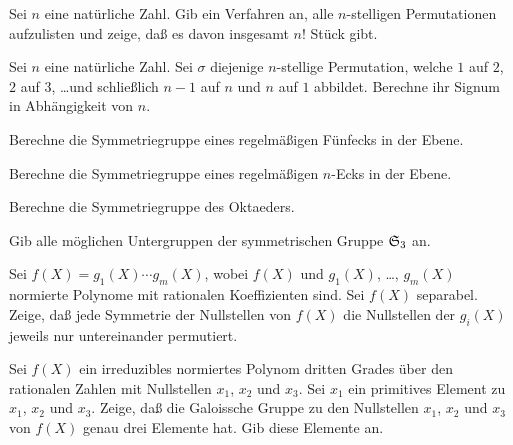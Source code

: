 \documentclass{algsheet}
\author{Dipl.-Math.~Arturo Mancino}
\date{12.~Januar 2011}
\begin{document}
                \maketitle



\begin{exercise}
    Sei \(n\) eine natürliche Zahl. Gib ein Verfahren an, alle \(n\)-stelligen Permutationen
    aufzulisten und zeige, daß es davon insgesamt \(n!\) Stück gibt. 
\end{exercise}

\begin{exercise}
    Sei \(n\) eine natürliche Zahl. Sei \(\sigma\) diejenige \(n\)-stellige Permutation, welche
    \(1\) auf \(2\), \(2\) auf \(3\), \dots und schließlich \(n - 1\) auf \(n\) und
    \(n\) auf \(1\) abbildet. Berechne ihr Signum in Abhängigkeit von \(n\).
\end{exercise}

\begin{exercise}
    Berechne die Symmetriegruppe eines regelmäßigen Fünfecks in der Ebene.
\end{exercise}

\begin{exercise}
    Berechne die Symmetriegruppe eines regelmäßigen \(n\)-Ecks in der Ebene.
\end{exercise}

\begin{exercise}
    Berechne die Symmetriegruppe des Oktaeders.
\end{exercise}

\begin{exercise}
    Gib alle möglichen Untergruppen der symmetrischen Gruppe \(\mathfrak S_3\) an.
\end{exercise}


\begin{exercise}
    Sei \(f(X) = g_1(X) \dotsm g_m(X)\), wobei \(f(X)\) und \(g_1(X)\), \dots, \(g_m(X)\) normierte 
    Polynome
    mit rationalen Koeffizienten sind. Sei \(f(X)\) separabel. Zeige, daß jede
    Symmetrie der Nullstellen von \(f(X)\) die Nullstellen der \(g_i(X)\) jeweils
    nur untereinander permutiert.
\end{exercise}


\begin{exercise}
    Sei \(f(X)\) ein irreduzibles normiertes Polynom dritten Grades über den rationalen Zahlen mit
    Nullstellen \(x_1\), \(x_2\) und \(x_3\). Sei \(x_1\) ein primitives Element zu \(x_1\), \(x_2\)
    und \(x_3\). Zeige, daß die Galoissche Gruppe zu den Nullstellen \(x_1\), \(x_2\) und \(x_3\) von
    \(f(X)\) genau drei Elemente hat. Gib diese Elemente an.
\end{exercise}
\end{document}
